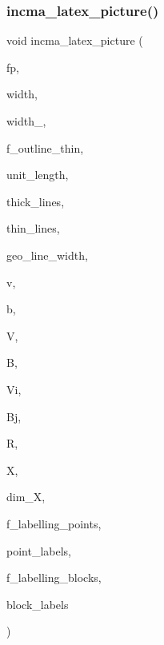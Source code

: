 \subsubsection{\texorpdfstring{incma\+\_\+latex\+\_\+picture()}{incma\_latex\_picture()}}
{\footnotesize\ttfamily void incma\+\_\+latex\+\_\+picture (\begin{DoxyParamCaption}\item[{ostream \&}]{fp,  }\item[{\mbox{\hyperlink{galois_8h_a09fddde158a3a20bd2dcadb609de11dc}{I\+NT}}}]{width,  }\item[{\mbox{\hyperlink{galois_8h_a09fddde158a3a20bd2dcadb609de11dc}{I\+NT}}}]{width\+\_,  }\item[{\mbox{\hyperlink{galois_8h_a09fddde158a3a20bd2dcadb609de11dc}{I\+NT}}}]{f\+\_\+outline\+\_\+thin,  }\item[{const \mbox{\hyperlink{galois_8h_ab6cc7b4aeb6ea31aba2b3fbfc83ff5e6}{B\+Y\+TE}} $\ast$}]{unit\+\_\+length,  }\item[{const \mbox{\hyperlink{galois_8h_ab6cc7b4aeb6ea31aba2b3fbfc83ff5e6}{B\+Y\+TE}} $\ast$}]{thick\+\_\+lines,  }\item[{const \mbox{\hyperlink{galois_8h_ab6cc7b4aeb6ea31aba2b3fbfc83ff5e6}{B\+Y\+TE}} $\ast$}]{thin\+\_\+lines,  }\item[{const \mbox{\hyperlink{galois_8h_ab6cc7b4aeb6ea31aba2b3fbfc83ff5e6}{B\+Y\+TE}} $\ast$}]{geo\+\_\+line\+\_\+width,  }\item[{\mbox{\hyperlink{galois_8h_a09fddde158a3a20bd2dcadb609de11dc}{I\+NT}}}]{v,  }\item[{\mbox{\hyperlink{galois_8h_a09fddde158a3a20bd2dcadb609de11dc}{I\+NT}}}]{b,  }\item[{\mbox{\hyperlink{galois_8h_a09fddde158a3a20bd2dcadb609de11dc}{I\+NT}}}]{V,  }\item[{\mbox{\hyperlink{galois_8h_a09fddde158a3a20bd2dcadb609de11dc}{I\+NT}}}]{B,  }\item[{\mbox{\hyperlink{galois_8h_a09fddde158a3a20bd2dcadb609de11dc}{I\+NT}} $\ast$}]{Vi,  }\item[{\mbox{\hyperlink{galois_8h_a09fddde158a3a20bd2dcadb609de11dc}{I\+NT}} $\ast$}]{Bj,  }\item[{\mbox{\hyperlink{galois_8h_a09fddde158a3a20bd2dcadb609de11dc}{I\+NT}} $\ast$}]{R,  }\item[{\mbox{\hyperlink{galois_8h_a09fddde158a3a20bd2dcadb609de11dc}{I\+NT}} $\ast$}]{X,  }\item[{\mbox{\hyperlink{galois_8h_a09fddde158a3a20bd2dcadb609de11dc}{I\+NT}}}]{dim\+\_\+X,  }\item[{\mbox{\hyperlink{galois_8h_a09fddde158a3a20bd2dcadb609de11dc}{I\+NT}}}]{f\+\_\+labelling\+\_\+points,  }\item[{const \mbox{\hyperlink{galois_8h_ab6cc7b4aeb6ea31aba2b3fbfc83ff5e6}{B\+Y\+TE}} $\ast$$\ast$}]{point\+\_\+labels,  }\item[{\mbox{\hyperlink{galois_8h_a09fddde158a3a20bd2dcadb609de11dc}{I\+NT}}}]{f\+\_\+labelling\+\_\+blocks,  }\item[{const \mbox{\hyperlink{galois_8h_ab6cc7b4aeb6ea31aba2b3fbfc83ff5e6}{B\+Y\+TE}} $\ast$$\ast$}]{block\+\_\+labels }\end{DoxyParamCaption})}

